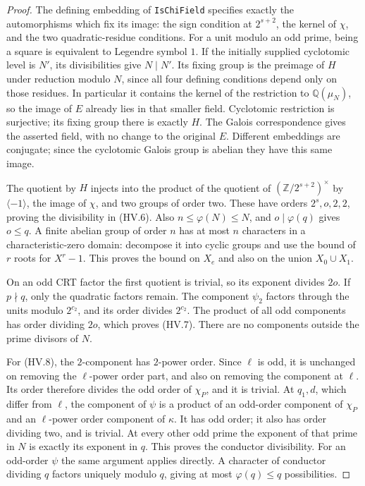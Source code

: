 \begin{proof}
The defining embedding of \texttt{IsChiField} specifies exactly
the automorphisms which fix its image: the sign condition at
$2^{s+2}$, the kernel of $\chi$, and the two quadratic-residue
conditions.  For a unit modulo an odd prime, being a square is
equivalent to Legendre symbol $1$.  If the initially supplied
cyclotomic level is $N'$, its divisibilities give $N\mid N'$.
Its fixing group is the preimage of $H$ under reduction modulo
$N$, since all four defining conditions depend only on those
residues.  In particular it contains the kernel of the restriction
to $\mathbb Q(\mu_N)$, so the image of $E$ already lies in
that smaller field.  Cyclotomic restriction is surjective;
its fixing group there is exactly $H$.
The Galois correspondence gives the asserted field, with no
change to the original $E$.
Different embeddings are conjugate; since the cyclotomic Galois
group is abelian they have this same image.

The quotient by $H$ injects into the product of the quotient
of $(\mathbb Z/2^{s+2})^\times$ by $\langle-1\rangle$, the
image of $\chi$, and two groups of order two.  These have orders
$2^s,o,2,2$, proving the divisibility in (HV.6).
Also $n\le\varphi(N)\le N$, and $o\mid\varphi(q)$ gives
$o\le q$.  A finite abelian group of order $n$ has at most $n$
characters in a characteristic-zero domain: decompose it into
cyclic groups and use the bound of $r$ roots for $X^r-1$.
This proves the bound on $X_e$ and also on the union $X_0\cup X_1$.

On an odd CRT factor the first quotient is trivial, so its
exponent divides $2o$.  If $p\nmid q$, only the quadratic factors
remain.  The component $\psi_2$ factors through the units modulo
$2^{c_2}$, and its order divides $2^{c_2}$.  The product of all
odd components has order dividing $2o$, which proves (HV.7).
There are no components outside the prime divisors of $N$.

For (HV.8), the $2$-component has $2$-power order.  Since $\ell$
is odd, it is unchanged on removing the $\ell$-power order part,
and also on removing the component at $\ell$.  Its order
therefore divides the odd order of $\chi_P$, and it is trivial.
At $q_1,d$, which differ from $\ell$, the component of $\psi$
is a product of an odd-order component of $\chi_P$ and an
$\ell$-power order component of $\kappa$.  It has odd order;
it also has order dividing two, and is trivial.  At every other
odd prime the exponent of that prime in $N$ is exactly its
exponent in $q$.  This proves the conductor divisibility.
For an odd-order $\psi$ the same argument applies directly.
A character of conductor dividing $q$ factors uniquely modulo
$q$, giving at most $\varphi(q)\le q$ possibilities.


\end{proof}
